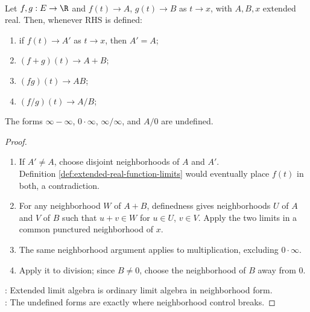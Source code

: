 \begin{theorem} \label{thm:extended-limit-algebra} \\
Let $f,g:E\to\R$ and $f(t)\to A$, $g(t)\to B$ as $t\to x$, with $A,B,x$ extended real. Then, whenever RHS is defined:
\begin{enumerate}[label=(\roman*)]
\setlength{\itemsep}{0pt}
\item if $f(t)\to A'$ as $t\to x$, then $A'=A$;
\item $(f+g)(t)\to A+B$;
\item $(fg)(t)\to AB$;
\item $(f/g)(t)\to A/B$;
\end{enumerate}
The forms $\infty-\infty$, $0\cdot\infty$, $\infty/\infty$, and $A/0$ are undefined.
\begin{proof}
\begin{enumerate}[label=(\roman*)]
\setlength{\itemsep}{0pt}
\item If $A'\neq A$, choose disjoint neighborhoods of $A$ and $A'$.\\
Definition \ref{def:extended-real-function-limits} would eventually place $f(t)$ in both, a contradiction.
\item For any neighborhood $W$ of $A+B$, definedness gives neighborhoods $U$ of $A$ and $V$ of $B$ such that $u+v\in W$ for $u\in U$, $v\in V$. Apply the two limits in a common punctured neighborhood of $x$.
\item The same neighborhood argument applies to multiplication, excluding $0\cdot\infty$.
\item Apply it to division; since $B\neq0$, choose the neighborhood of $B$ away from $0$.
\end{enumerate}
: Extended limit algebra is ordinary limit algebra in neighborhood form.\\
: The undefined forms are exactly where neighborhood control breaks.
\end{proof}
\end{theorem}
